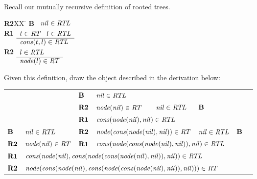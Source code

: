 \documentclass[addpoints]{exam}
\begin{document}
\begin{questions}
\question[3] 
Recall our mutually recursive definition of rooted trees.
\begin{tabbing}
{\bf R2}XX \=  \kill
{\bf B} \>
        \(\begin{array}[t]{l}
        \mbox{\it nil\/}\in\mbox{\it RTL\/}
        \end{array}\) \\[2ex]
{\bf R1} \>
        \(\begin{array}[t]{l}
        t\in\mbox{\it RT\/}\;\;\;l\in\mbox{\it RTL\/} \\
        \hline
        \mbox{\it cons\/}(t,l)\in\mbox{\it RTL\/}
        \end{array}\) \\[2ex]
{\bf R2} \>
        \(\begin{array}[t]{l}
        l\in\mbox{\it RTL\/} \\
        \hline
        \mbox{\it node\/}(l)\in\mbox{\it RT\/}
        \end{array}\)
\end{tabbing}

Given this definition, draw the object described in the derivation below: 

\begin{tabular}{llllllll}
           &                                 & $\mbox{\bf B}$             & $\mbox{\it nil\/}\in\mbox{\it RTL\/}$ & & & &\\ 
\cline{4-4}
           &                                 & $\mbox{\bf R2}$            & $\mbox{\it node\/}(\mbox{\it nil\/})\in\mbox{\it RT\/}$ & $\mbox{\it nil\/}\in\mbox{\it RTL\/}$ & $\mbox{\bf B}$ & & \\ 
\cline{4-5}
           &                                 & $\mbox{\bf R1}$            & \multicolumn{2}{l}{$\mbox{\it cons\/}(\mbox{\it node\/}(\mbox{\it nil\/}),\mbox{\it nil\/})\in\mbox{\it RTL\/}$}  & & &\\
\cline{4-5}
$\mbox{\bf B}$  & $\mbox{\it nil\/}\in\mbox{\it RTL\/}$           & $\mbox{\bf R2}$            & \multicolumn{2}{l}{$\mbox{\it node\/}(\mbox{\it cons\/}(\mbox{\it node\/}(\mbox{\it nil\/}),\mbox{\it nil\/}))\in\mbox{\it RT\/}$} & $\mbox{\it nil\/}\in\mbox{\it RTL\/}$ & $\mbox{\bf B}$ &\\ 
\cline{2-2} \cline{4-6}
$\mbox{\bf R2}$ & $\mbox{\it node\/}(\mbox{\it nil\/})\in\mbox{\it RT\/}$ & $\mbox{\bf R1}$            & \multicolumn{3}{l}{$\mbox{\it cons\/}(\mbox{\it node\/}(\mbox{\it cons\/}(\mbox{\it node\/}(\mbox{\it nil\/}),\mbox{\it nil\/})), \mbox{\it nil\/})\in\mbox{\it RTL\/}$} & & \\
\cline{2-6}
$\mbox{\bf R1}$ &
\multicolumn{5}{l}{$\mbox{\it cons\/}(\mbox{\it node\/}(\mbox{\it nil\/}),\mbox{\it cons\/}(\mbox{\it node\/}(\mbox{\it cons\/}(\mbox{\it node\/}(\mbox{\it nil\/}),\mbox{\it nil\/})),\mbox{\it nil\/})) \in \mbox{\it RTL\/}$} & &\\
\cline{2-6}
$\mbox{\bf R2}$ & \multicolumn{5}{l}{$\mbox{\it node\/}(\mbox{\it cons\/}(\mbox{\it node\/}(\mbox{\it nil\/}),\mbox{\it cons\/}(\mbox{\it node\/}(\mbox{\it cons\/}(\mbox{\it node\/}(\mbox{\it nil\/}),\mbox{\it nil\/})),\mbox{\it nil\/})))\in\mbox{\it RT\/}$} & &
\end{tabular}


\end{questions}
\end{document}
